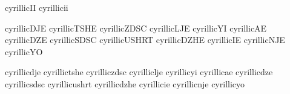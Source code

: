 


 cyrillicII    {}
 cyrillicii    {}


 cyrillicDJE    {}
 cyrillicTSHE   {}
 cyrillicZDSC   {}
 cyrillicLJE    {}
 cyrillicYI     {}
 cyrillicAE     {}
 cyrillicDZE    {}
 cyrillicSDSC   {}
 cyrillicUSHRT  {}
 cyrillicDZHE   {}
 cyrillicIE     {}
 cyrillicNJE    {}
 cyrillicYO     {}

 cyrillicdje    {}
 cyrillictshe   {}
 cyrilliczdsc   {}
 cyrilliclje    {}
 cyrillicyi     {}
 cyrillicae     {}
 cyrillicdze    {}
 cyrillicsdsc   {}
 cyrillicushrt  {}
 cyrillicdzhe   {}
 cyrillicie     {}
 cyrillicnje    {}
 cyrillicyo     {}


